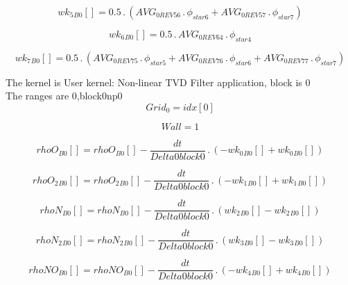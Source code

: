 \documentclass{article}
\begin{document}
\begin{dmath}{wk_{5}{_{B0}}}[{}] = 0.5 \,.\, \left(AVG_{0 REV 56} \,.\, \phi_{star 6} + AVG_{0 REV 57} \,.\, \phi_{star 7}\right)\end{dmath}

\begin{dmath}{wk_{6}{_{B0}}}[{}] = 0.5 \,.\, AVG_{0 REV 64} \,.\, \phi_{star 4}\end{dmath}

\begin{dmath}{wk_{7}{_{B0}}}[{}] = 0.5 \,.\, \left(AVG_{0 REV 75} \,.\, \phi_{star 5} + AVG_{0 REV 76} \,.\, \phi_{star 6} + AVG_{0 REV 77} \,.\, \phi_{star 7}\right)\end{dmath}

\noindent The kernel is User kernel: Non-linear TVD Filter application, block is 0\\\noindent The ranges are 0,block0np0\\\begin{dmath}Grid_{0} = {idx}[{0}]\end{dmath}

\begin{dmath}Wall = 1\end{dmath}

\begin{dmath}{rhoO{_{B0}}}[{}] = {rhoO{_{B0}}}[{}] - \frac{dt}{Delta0block0} \,.\, \left(- {wk_{0}{_{B0}}}[{}] + {wk_{0}{_{B0}}}[{}]\right)\end{dmath}

\begin{dmath}{rhoO_{2}{_{B0}}}[{}] = {rhoO_{2}{_{B0}}}[{}] - \frac{dt}{Delta0block0} \,.\, \left(- {wk_{1}{_{B0}}}[{}] + {wk_{1}{_{B0}}}[{}]\right)\end{dmath}

\begin{dmath}{rhoN{_{B0}}}[{}] = {rhoN{_{B0}}}[{}] - \frac{dt}{Delta0block0} \,.\, \left({wk_{2}{_{B0}}}[{}] - {wk_{2}{_{B0}}}[{}]\right)\end{dmath}

\begin{dmath}{rhoN_{2}{_{B0}}}[{}] = {rhoN_{2}{_{B0}}}[{}] - \frac{dt}{Delta0block0} \,.\, \left({wk_{3}{_{B0}}}[{}] - {wk_{3}{_{B0}}}[{}]\right)\end{dmath}

\begin{dmath}{rhoNO{_{B0}}}[{}] = {rhoNO{_{B0}}}[{}] - \frac{dt}{Delta0block0} \,.\, \left(- {wk_{4}{_{B0}}}[{}] + {wk_{4}{_{B0}}}[{}]\right)\end{dmath}
\end{document}
